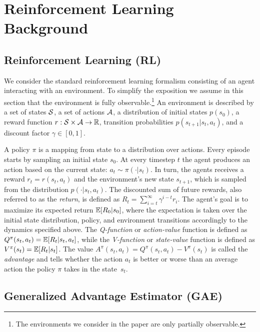 \section{Reinforcement Learning Background}\label{sec:rl}




\subsection{Reinforcement Learning (RL)}

We consider the standard reinforcement learning formalism
consisting of an agent interacting with an environment.
To simplify the exposition we assume in this section that the environment is fully observable.\footnote{The environments
we consider in the paper are only partially observable.}
An environment
is described by
a set of states $\S$,
a set of actions $\A$,
a distribution of initial states $p(s_0)$,
a reward function $r : \S \times \A \rightarrow \R$,
transition probabilities $p(s_{t+1}|s_t,a_t)$,
and a discount factor $\gamma \in [0,1]$.

A policy $\pi$ is a mapping from state to a distribution over actions.
Every episode starts by sampling an initial state $s_0$.
At every timestep $t$ the agent produces an action based on the current state:
$a_t \sim \pi(\cdot|s_t)$.
In turn, the agents receives a reward $r_t=r(s_t,a_t)$ and the environment's new state $s_{t+1}$, which is sampled from the distribution $p(\cdot|s_t,a_t)$.
The discounted sum of future rewards, also referred to as the \emph{return}, is defined as
$R_t=\sum_{i=t}^\infty \gamma^{i-t} r_i$.
The agent's goal is to maximize its expected return $\E [R_0|s_0]$, where
the expectation is taken over the initial state distribution, policy, and environment transitions accordingly to the dynamics
specified above.
The \emph{Q-function} or \emph{action-value} function is defined as $Q^\pi(s_t,a_t)=\E[R_t|s_t,a_t]$, while the
\emph{V-function} or \emph{state-value} function is defined as $V^\pi(s_t)=\E[R_t|s_t]$.
The value $A^\pi(s_t,a_t)=Q^\pi(s_t,a_t)-V^\pi(s_t)$ is called
the \emph{advantage} and tells whether the action $a_t$ is better or worse than an average
action the policy $\pi$ takes in the state~$s_t$.



\subsection{Generalized Advantage Estimator (GAE)} \label{sec:gae}

